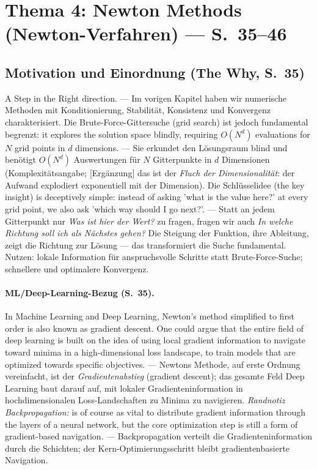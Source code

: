 \section{Thema 4: Newton Methods (Newton-Verfahren) — S.~35--46}

\subsection{Motivation und Einordnung (The Why, S.~35)}
\glqq A Step in the Right direction.\grqq{} — Im vorigen Kapitel haben wir numerische Methoden mit Konditionierung, Stabilität, Konsistenz und Konvergenz charakterisiert. Die Brute-Force-Gittersuche (grid search) ist jedoch fundamental begrenzt: \glqq it explores the solution space blindly, requiring $O(N^d)$ evaluations for $N$ grid points in $d$ dimensions.\grqq{} — Sie erkundet den Lösungsraum blind und benötigt $O(N^d)$ Auswertungen für $N$ Gitterpunkte in $d$ Dimensionen (Komplexitätsangabe; [Ergänzung] das ist der \emph{Fluch der Dimensionalität}: der Aufwand explodiert exponentiell mit der Dimension). Die Schlüsselidee (the key insight) \glqq is deceptively simple: instead of asking 'what is the value here?' at every grid point, we also ask 'which way should I go next?'.\grqq{} — Statt an jedem Gitterpunkt nur \emph{Was ist hier der Wert?} zu fragen, fragen wir auch \emph{In welche Richtung soll ich als Nächstes gehen?} Die Steigung der Funktion, ihre Ableitung, zeigt die Richtung zur Lösung — das transformiert die Suche fundamental. Nutzen: lokale Information für anspruchsvolle Schritte statt Brute-Force-Suche; schnellere und optimalere Konvergenz.

\paragraph{ML/Deep-Learning-Bezug (S.~35).} \glqq In Machine Learning and Deep Learning, Newton's method simplified to first order is also known as gradient descent. One could argue that the entire field of deep learning is built on the idea of using local gradient information to navigate toward minima in a high-dimensional loss landscape, to train models that are optimized towards specific objectives.\grqq{} — Newtons Methode, auf erste Ordnung vereinfacht, ist der \emph{Gradientenabstieg} (gradient descent); das gesamte Feld Deep Learning baut darauf auf, mit lokaler Gradienteninformation in hochdimensionalen Loss-Landschaften zu Minima zu navigieren. \emph{Randnotiz Backpropagation:} \glqq is of course as vital to distribute gradient information through the layers of a neural network, but the core optimization step is still a form of gradient-based navigation.\grqq{} — Backpropagation verteilt die Gradienteninformation durch die Schichten; der Kern-Optimierungsschritt bleibt gradientenbasierte Navigation.

